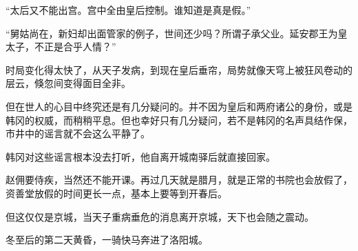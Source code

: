 “太后又不能出宫。宫中全由皇后控制。谁知道是真是假。”

“舅姑尚在，新妇却出面管家的例子，世间还少吗？所谓子承父业。延安郡王为皇太子，不正是合乎人情？”

时局变化得太快了，从天子发病，到现在皇后垂帘，局势就像天穹上被狂风卷动的层云，倏忽间变得面目全非。

但在世人的心目中终究还是有几分疑问的。并不因为皇后和两府诸公的身份，或是韩冈的权威，而稍稍平息。但也幸好只有几分疑问，若不是韩冈的名声具结作保，市井中的谣言就不会这么平静了。

韩冈对这些谣言根本没去打听，他自离开城南驿后就直接回家。

赵佣要侍疾，当然还不能开课。再过几天就是腊月，就是正常的书院也会放假了，资善堂放假的时间更长一点，基本上要等到开春后。

但这仅仅是京城，当天子重病垂危的消息离开京城，天下也会随之震动。

冬至后的第二天黄昏，一骑快马奔进了洛阳城。

